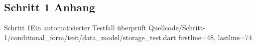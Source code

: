 \subsection{Schritt 1 Anhang} 
\label{appendix:Schritt1Anhang}


\begin{alexlisting}{Schritt 1}{Ein automatisierter Testfall überprüft}
    {Quellcode/Schritt-1/conditional_form/test/data_model/storage_test.dart}
    {firstline=48, lastline=74}
    \label{lst:Schritt1MaßnahmenDeserialisierenOhneFehlerUnitTest}
  \end{alexlisting}